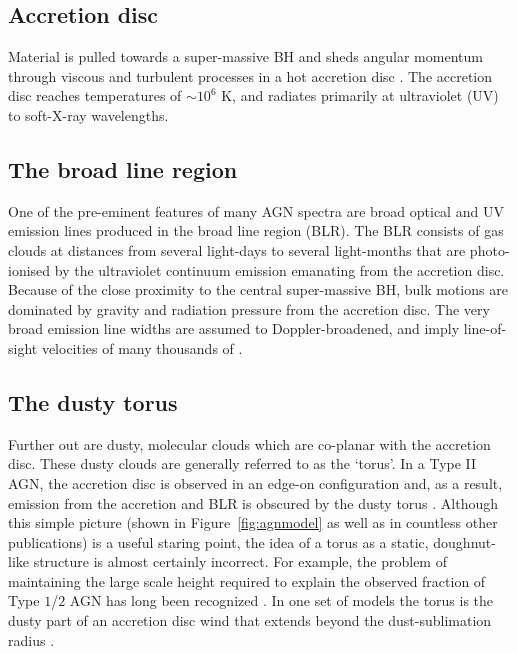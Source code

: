 \subsection{Accretion disc}

Material is pulled towards a super-massive BH and sheds angular momentum through viscous and turbulent processes in a hot accretion disc \citep[e.g.][]{begelman85}. 
The accretion disc reaches temperatures of $\sim10^6$ K, and radiates primarily at ultraviolet (UV) to soft-X-ray wavelengths. 

\subsection{The broad line region}

One of the pre-eminent features of many AGN spectra are broad optical and UV emission lines produced in the broad line region (BLR). 
The BLR consists of gas clouds at distances from several light-days to several light-months that are photo-ionised by the ultraviolet continuum emission emanating from the accretion disc.  
Because of the close proximity to the central super-massive BH, bulk motions are dominated by gravity and radiation pressure from the accretion disc.
The very broad emission line widths are assumed to Doppler-broadened, and imply line-of-sight velocities of many thousands of \kms. 

\subsection{The dusty torus}

Further out are dusty, molecular clouds which are co-planar with the accretion disc. 
These dusty clouds are generally referred to as the `torus'. 
In a Type II AGN, the accretion disc is observed in an edge-on configuration and, as a result, emission from the accretion and BLR is obscured by the dusty torus \citep[e.g.][]{antonucci93}.
Although this simple picture (shown in Figure~\ref{fig:agnmodel} as well as in countless other publications) is a useful staring point, the idea of a torus as a static, doughnut-like structure is almost certainly incorrect. 
For example, the problem of maintaining the large scale height required to explain the observed fraction of Type $1$/$2$ AGN has long been recognized \citep[e.g.][]{krolik88}. 
In one set of models the torus is the dusty part of an accretion disc wind that extends beyond the dust-sublimation radius \citep[e.g.][]{konigl94,everett09,gallagher12,everett05,keating12,elitzur06}. 

